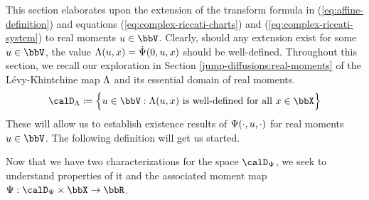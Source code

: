 This section elaborates upon the extension of the transform formula in (\ref{eq:affine-definition}) and equations (\ref{eq:complex-riccati-charts}) and (\ref{eq:complex-riccati-system}) to real moments $\momentVar \in \vecSpace$. 
Clearly, should any extension exist for some $\momentVar \in \vecSpace$, the value $\Lambda(u, x) = \dot{\Psi}(0,u,x)$ should be well-defined.
Throughout this section, we recall our exploration in Section \ref{jump-diffusions:real-moments} of the L\'evy-Khintchine map $\Lambda$ and its essential domain of real moments.
\begin{equation*}
  \odeSpace \defeq \Big\{ \momentVar \in \vecSpace : \ode(\momentVar, \stateVar) \text{ is well-defined for all } \stateVar \in \stateSpace \Big\}
\end{equation*}
These will allow us to establish existence results of $\Psi(\cdot, u, \cdot)$ for real moments $\momentVar \in \vecSpace$.
The following definition will get us started.





Now that we have two characterizations for the space $\momentSpace$, we seek to understand properties of it and the associated moment map $\aff: \momentSpace \times \stateSpace \rightarrow \bbR$.




